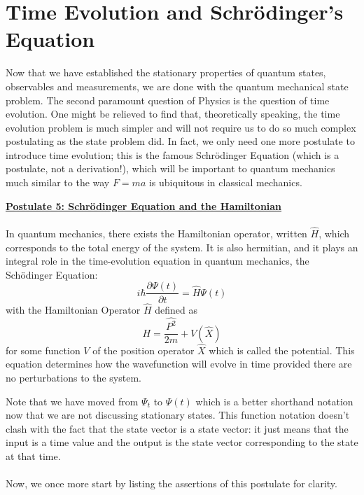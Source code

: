 \section{Time Evolution and Schr\"{o}dinger's Equation} 
Now that we have established the stationary properties of quantum states, observables and measurements, we are done with the quantum mechanical state problem. The second paramount question of Physics is the question of time evolution. One might be relieved to find that, theoretically speaking, the time evolution problem is much simpler and will not require us to do so much complex postulating as the state problem did. In fact, we only need one more postulate to introduce time evolution; this is the famous Schr\"{o}dinger Equation (which is a postulate, not a derivation!), which will be important to quantum mechanics much similar to the way $F=ma$ is ubiquitous in classical mechanics.
\begin{tcolorbox}
\underline{\textbf{Postulate 5: Schr\"{o}dinger Equation and the Hamiltonian}}\\\\
In quantum mechanics, there exists the Hamiltonian operator, written $\hat{H}$, which corresponds to the total energy of the system. It is also hermitian, and it plays an integral role in the time-evolution equation in quantum mechanics, the Sch\"{o}dinger Equation:
$$
i\hbar\frac{\partial \Psi(t)}{\partial t}=\hat{H}\Psi(t)
$$
with the Hamiltonian Operator $\hat{H}$ defined as
$$
H = \frac{\hat{P^2}}{2m} + V(\hat{X})
$$
for some function $V$ of the position operator $\hat{X}$ which is called the potential. This equation determines how the wavefunction will evolve in time provided there are no perturbations to the system.
\end{tcolorbox} 
Note that we have moved from $\Psi_{t}$ to $\Psi(t)$
which is a better shorthand notation now that we are not discussing stationary states. This function notation doesn't clash with the fact that the state vector is a state vector: it just means that the input is a time value and the output is the state vector corresponding to the state at that time.
\\\\
Now, we once more start by listing the assertions of this postulate for clarity.
